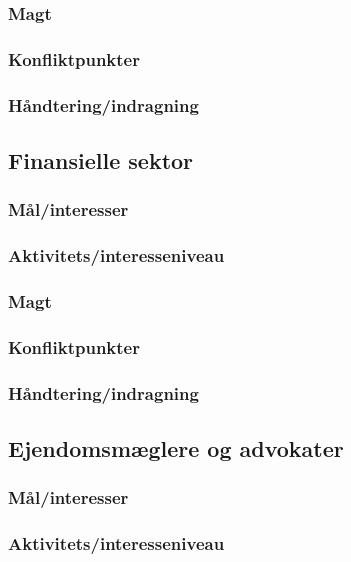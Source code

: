\documentclass[10pt,a4paper,danish]{article}
\begin{document}
\subsubsection{Magt}

\subsubsection{Konfliktpunkter}

\subsubsection{Håndtering/indragning}

\subsection{Finansielle sektor}
\subsubsection{Mål/interesser}

\subsubsection{Aktivitets/interesseniveau}

\subsubsection{Magt}

\subsubsection{Konfliktpunkter}

\subsubsection{Håndtering/indragning}

\subsection{Ejendomsmæglere og advokater}
\subsubsection{Mål/interesser}

\subsubsection{Aktivitets/interesseniveau}
\end{document}
